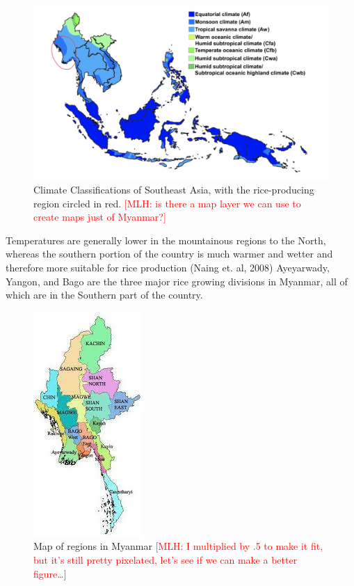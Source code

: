 \documentclass{book}\usepackage{knitr}
\newcommand{\red}[1]{\textcolor{red}{[MLH: #1]}}
\begin{document}
\begin{knitrout}
\begin{kframe}
{\begin{figure}
\includegraphics[width=\linewidth]{images/myanmar/Image2.jpg}
\caption{Climate Classifications of Southeast Asia, with the rice-producing region circled in red. \red{is there a map layer we can use to create maps just of Myanmar?}}
\end{figure}

Temperatures are generally lower in the mountainous regions to the North, whereas the southern portion of the country is much warmer and wetter and therefore more suitable for rice production (Naing et. al, 2008) Ayeyarwady, Yangon, and Bago are the three major rice growing divisions in Myanmar, all of which are in the Southern part of the country. 

\begin{figure}
\includegraphics[width=.5\linewidth]{images/myanmar/Image3.jpg}
\caption{Map of regions in Myanmar \red{I multiplied by .5 to make it fit, but it's still pretty pixelated, let's see if we can make a better figure\ldots}}
\end{figure}

}
\end{kframe}
\end{knitrout}
\end{document}
